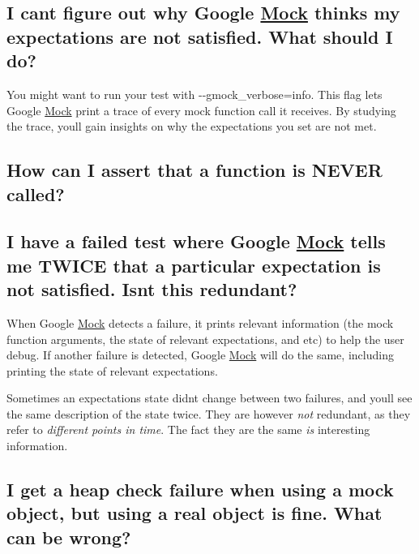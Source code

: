 \subsection*{I can\textquotesingle{}t figure out why Google \mbox{\hyperlink{class_mock}{Mock}} thinks my expectations are not satisfied. What should I do?}

You might want to run your test with {\ttfamily -\/-\/gmock\+\_\+verbose=info}. This flag lets Google \mbox{\hyperlink{class_mock}{Mock}} print a trace of every mock function call it receives. By studying the trace, you\textquotesingle{}ll gain insights on why the expectations you set are not met.

\subsection*{How can I assert that a function is N\+E\+V\+ER called?}


\begin{DoxyCode}{0}
\end{DoxyCode}


\subsection*{I have a failed test where Google \mbox{\hyperlink{class_mock}{Mock}} tells me T\+W\+I\+CE that a particular expectation is not satisfied. Isn\textquotesingle{}t this redundant?}

When Google \mbox{\hyperlink{class_mock}{Mock}} detects a failure, it prints relevant information (the mock function arguments, the state of relevant expectations, and etc) to help the user debug. If another failure is detected, Google \mbox{\hyperlink{class_mock}{Mock}} will do the same, including printing the state of relevant expectations.

Sometimes an expectation\textquotesingle{}s state didn\textquotesingle{}t change between two failures, and you\textquotesingle{}ll see the same description of the state twice. They are however {\itshape not} redundant, as they refer to {\itshape different points in time}. The fact they are the same {\itshape is} interesting information.

\subsection*{I get a heap check failure when using a mock object, but using a real object is fine. What can be wrong?}

